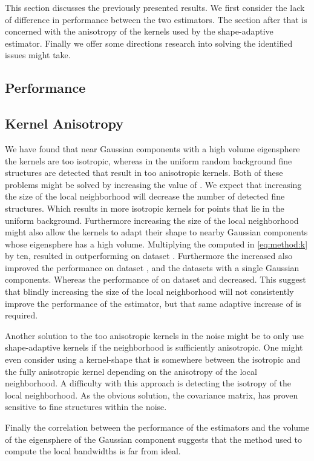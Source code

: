 This section discusses the previously presented results. We first consider the lack of difference in performance between the two estimators. The section after that is concerned with the anisotropy of the kernels used by the shape-adaptive estimator. Finally we offer some directions research into solving the identified issues might take.

\subsection{Performance}
\label{s:discussion:performance}


\subsection{Kernel Anisotropy}
\label{s:discussion:anisotropy}


We have found that near Gaussian components with a high volume eigensphere the kernels are too isotropic, whereas in the uniform random background fine structures are detected that result in too anisotropic kernels. Both of these problems might be solved by increasing the value of \KNNK. 
We expect that increasing the size of the local neighborhood will decrease the number of detected fine structures. Which results in more isotropic kernels for points that lie in the uniform background.
Furthermore increasing the size of the local neighborhood might also allow the kernels to adapt their shape to nearby Gaussian components whose eigensphere has a high volume. Multiplying the \KNNK computed in \cref{eq:method:k} by ten, resulted in \sambe outperforming \mbe on dataset \baakmanFive. Furthermore the increased \KNNK also improved the performance on dataset \ferdosiThree, \baakmanThree and the datasets with a single Gaussian components. Whereas the performance of \sambe on dataset \ferdosiTwo and \baakmanTwo decreased. This suggest that blindly increasing the size of the local neighborhood will not consistently improve the performance of the estimator, but that same adaptive increase of \KNNK is required.

Another solution to the too anisotropic kernels in the noise might be to only use shape-adaptive kernels if the neighborhood is sufficiently anisotropic. One might even consider using a kernel-shape that is somewhere between the isotropic and the fully anisotropic kernel depending on the anisotropy of the local neighborhood. A difficulty with this approach is detecting the isotropy of the local neighborhood. As the obvious solution, the covariance matrix, has proven sensitive to fine structures within the noise. 

Finally the correlation between the performance of the estimators and the volume of the eigensphere of the Gaussian component suggests that the method used to compute the local bandwidths is far from ideal. 